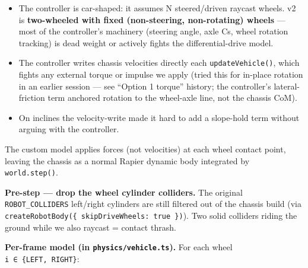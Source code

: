 \documentclass[
]{article}
\providecommand{\tightlist}{%
  \setlength{\itemsep}{0pt}\setlength{\parskip}{0pt}}
\begin{document}
\begin{itemize}
\tightlist
\item
  The controller is car-shaped: it assumes N steered/driven raycast
  wheels. v2 is \textbf{two-wheeled with fixed (non-steering,
  non-rotating) wheels} --- most of the controller's machinery (steering
  angle, axle Cs, wheel rotation tracking) is dead weight or actively
  fights the differential-drive model.
\item
  The controller writes chassis velocities directly each
  \texttt{updateVehicle()}, which fights any external torque or impulse
  we apply (tried this for in-place rotation in an earlier session ---
  see ``Option 1 torque'' history; the controller's lateral-friction
  term anchored rotation to the wheel-axle line, not the chassis CoM).
\item
  On inclines the velocity-write made it hard to add a slope-hold term
  without arguing with the controller.
\end{itemize}

The custom model applies forces (not velocities) at each wheel contact
point, leaving the chassis as a normal Rapier dynamic body integrated by
\texttt{world.step()}.

\textbf{Pre-step --- drop the wheel cylinder colliders.} The original
\texttt{ROBOT\_COLLIDERS} left/right cylinders are still filtered out of
the chassis build (via
\texttt{createRobotBody(\{\ skipDriveWheels:\ true\ \})}). Two solid
colliders riding the ground while we also raycast = contact thrash.

\textbf{Per-frame model (in \texttt{physics/vehicle.ts}).} For each
wheel \texttt{i\ ∈\ \{LEFT,\ RIGHT\}}:
\end{document}
